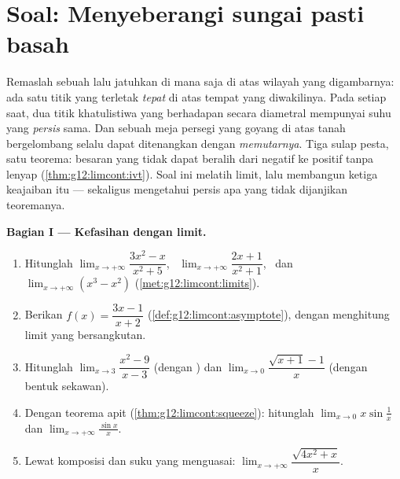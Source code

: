 \section{Soal: Menyeberangi sungai pasti basah}

\begin{problem}
\label{pb:g12:limcont:1}
Remaslah sebuah  lalu jatuhkan di mana saja di atas wilayah yang
digambarnya: ada satu titik  yang terletak \emph{tepat} di atas tempat
yang diwakilinya. Pada setiap saat, dua titik khatulistiwa yang berhadapan
secara diametral mempunyai suhu yang \emph{persis} sama. Dan sebuah meja
persegi yang goyang di atas tanah bergelombang selalu dapat ditenangkan dengan
\emph{memutarnya}. Tiga sulap pesta, satu teorema: besaran yang 
tidak dapat beralih dari negatif ke positif tanpa lenyap
(\cref{thm:g12:limcont:ivt}). Soal ini melatih limit, lalu
membangun ketiga keajaiban itu --- sekaligus mengetahui persis apa yang
tidak dijanjikan teoremanya.

\medskip
\noindent\textbf{Bagian I --- Kefasihan dengan limit.}
\begin{enumerate}
  \item Hitunglah $\lim_{x \to +\infty} \dfrac{3x^2 - x}{x^2 + 5}$,
        \ $\lim_{x \to +\infty} \dfrac{2x + 1}{x^2 + 1}$, \ dan
        $\lim_{x \to +\infty} (x^3 - x^2)$
        (\cref{met:g12:limcont:limits}).
  \item Berikan 
        $f(x) = \dfrac{3x - 1}{x + 2}$
        (\cref{def:g12:limcont:asymptote}), dengan menghitung
        limit yang bersangkutan.
  \item Hitunglah $\lim_{x \to 3} \dfrac{x^2 - 9}{x - 3}$
        (dengan ) dan
        $\lim_{x \to 0} \dfrac{\sqrt{x + 1} - 1}{x}$
        (dengan bentuk sekawan).
  \item Dengan teorema apit
        (\cref{thm:g12:limcont:squeeze}): hitunglah
        $\lim_{x \to 0} x \sin\frac1x$ dan
        $\lim_{x \to +\infty} \frac{\sin x}{x}$.
  \item Lewat komposisi dan suku yang menguasai:
        $\lim_{x \to +\infty} \dfrac{\sqrt{4x^2 + x}}{x}$.
\end{enumerate}


\end{problem}
